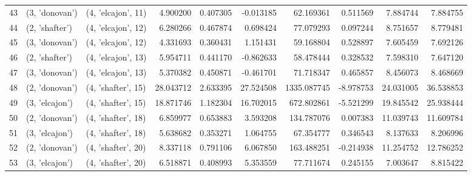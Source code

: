 \begin{tabular}{lllrrrrrrr}
43 &   (3, 'donovan') &  (4, 'elcajon', 11) &   4.900200 &   0.407305 &  -0.013185 &    62.169361 &   0.511569 &   7.884744 &   7.884755 \\
44 &   (2, 'shafter') &  (4, 'elcajon', 12) &   6.280266 &   0.467874 &   0.698424 &    77.079293 &   0.097244 &   8.751657 &   8.779481 \\
45 &   (3, 'donovan') &  (4, 'elcajon', 12) &   4.331693 &   0.360431 &   1.151431 &    59.168804 &   0.528897 &   7.605459 &   7.692126 \\
46 &   (2, 'shafter') &  (4, 'elcajon', 13) &   5.954711 &   0.441170 &  -0.862633 &    58.478444 &   0.328532 &   7.598310 &   7.647120 \\
47 &   (3, 'donovan') &  (4, 'elcajon', 13) &   5.370382 &   0.450871 &  -0.461701 &    71.718347 &   0.465857 &   8.456073 &   8.468669 \\
48 &   (2, 'donovan') &  (4, 'shafter', 15) &  28.043712 &   2.633395 &  27.524508 &  1335.087745 &  -8.978753 &  24.031005 &  36.538853 \\
49 &   (3, 'elcajon') &  (4, 'shafter', 15) &  18.871746 &   1.182304 &  16.702015 &   672.802861 &  -5.521299 &  19.845542 &  25.938444 \\
50 &   (2, 'donovan') &  (4, 'shafter', 18) &   6.859977 &   0.653883 &   3.593208 &   134.787076 &   0.007383 &  11.039743 &  11.609784 \\
51 &   (3, 'elcajon') &  (4, 'shafter', 18) &   5.638682 &   0.353271 &   1.064755 &    67.354777 &   0.346543 &   8.137633 &   8.206996 \\
52 &   (2, 'donovan') &  (4, 'shafter', 20) &   8.337118 &   0.791106 &   6.067850 &   163.488251 &  -0.214938 &  11.254752 &  12.786252 \\
53 &   (3, 'elcajon') &  (4, 'shafter', 20) &   6.518871 &   0.408993 &   5.353559 &    77.711674 &   0.245155 &   7.003647 &   8.815422 \\
\bottomrule
\end{tabular}
